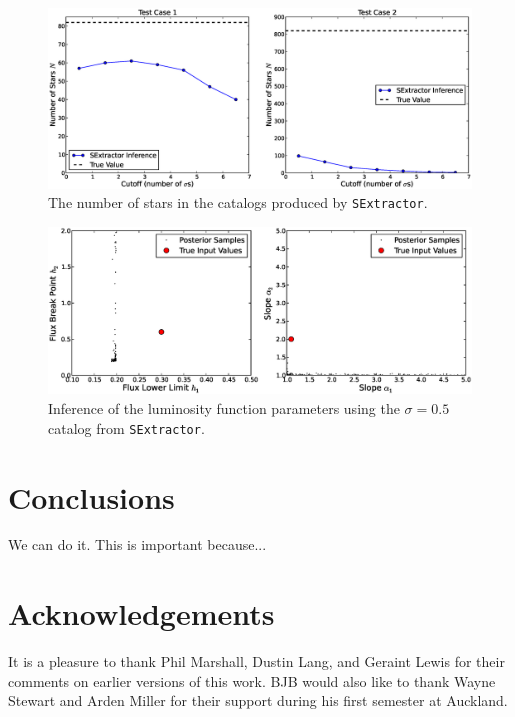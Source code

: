 \documentclass[manuscript]{aastex}
\newcommand{\sex}{{\tt SExtractor}}
\begin{document}
\begin{figure}
\begin{center}
\includegraphics[scale=0.45]{Figures/sex_N.eps}
\end{center}
\caption{The number of stars in the catalogs produced by \sex.\label{fig:sex_N}}
\end{figure}

\begin{figure}
\begin{center}
\includegraphics[scale=0.45]{Figures/sex_inference.eps}
\end{center}
\caption{Inference of the luminosity function parameters using the $\sigma=0.5$
catalog from \sex.\label{fig:sex_inference}}
\end{figure}


\section{Conclusions}
We can do it. This is important because...

\section{Acknowledgements}
It is a pleasure to thank Phil Marshall, Dustin Lang, and Geraint Lewis for
their comments on earlier versions of this work. BJB would also like to thank
Wayne Stewart and Arden Miller for their support during his first semester at
Auckland.
\end{document}
